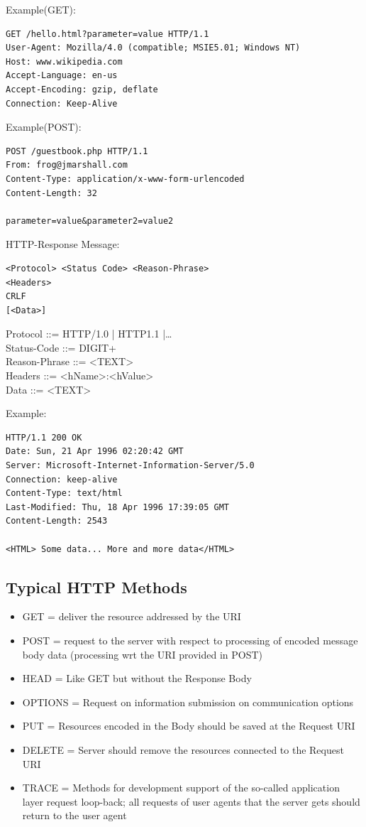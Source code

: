 \documentclass[11pt]{article}
\begin{document}
Example(GET):
\begin{verbatim}
GET /hello.html?parameter=value HTTP/1.1
User-Agent: Mozilla/4.0 (compatible; MSIE5.01; Windows NT)
Host: www.wikipedia.com
Accept-Language: en-us
Accept-Encoding: gzip, deflate
Connection: Keep-Alive

\end{verbatim}
Example(POST):
\begin{verbatim}
POST /guestbook.php HTTP/1.1
From: frog@jmarshall.com
Content-Type: application/x-www-form-urlencoded
Content-Length: 32

parameter=value&parameter2=value2
\end{verbatim}



HTTP-Response Message:
\begin{verbatim}
<Protocol> <Status Code> <Reason-Phrase>
<Headers>
CRLF
[<Data>]
\end{verbatim}
Protocol ::= HTTP/1.0 | HTTP1.1 |\ldots{}\\
Status-Code ::= DIGIT+\\
Reason-Phrase ::= <TEXT>\\
Headers ::= <hName>:<hValue>\\
Data ::= <TEXT>

Example:
\begin{verbatim}
HTTP/1.1 200 OK
Date: Sun, 21 Apr 1996 02:20:42 GMT
Server: Microsoft-Internet-Information-Server/5.0
Connection: keep-alive
Content-Type: text/html
Last-Modified: Thu, 18 Apr 1996 17:39:05 GMT
Content-Length: 2543

<HTML> Some data... More and more data</HTML>
\end{verbatim}

\subsection{Typical HTTP Methods}
\label{sec:orgc0f51b4}
\begin{itemize}
\item GET = deliver the resource addressed by the URI
\item POST = request to the server with respect to processing of encoded message body data (processing wrt the URI provided in POST)
\item HEAD = Like GET but without the Response Body
\item OPTIONS = Request on information submission on communication options
\item PUT = Resources encoded in the Body should be saved at the Request URI
\item DELETE = Server should remove the resources connected to the Request URI
\item TRACE = Methods for development support of the so-called application layer request loop-back; all requests of user agents that the server gets should return to the user agent
\end{itemize}
\end{document}

